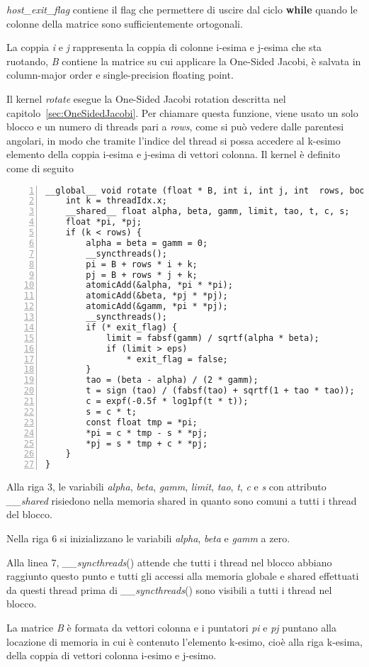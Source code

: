 \textit{host\_exit\_flag} contiene il flag che permettere di uscire dal ciclo \textbf{while} quando le colonne della matrice sono sufficientemente ortogonali.

La coppia \textit{i} e \textit{j} rappresenta la coppia di colonne i-esima e j-esima che sta ruotando, \textit{B} contiene la matrice su cui applicare la One-Sided Jacobi, è salvata in column-major order e single-precision floating point.

Il kernel \textit{rotate} esegue la One-Sided Jacobi rotation descritta nel capitolo~\ref{sec:OneSidedJacobi}. Per chiamare questa funzione, viene usato un solo blocco e un numero di threads pari a \textit{rows}, come si può vedere dalle parentesi angolari, in modo che tramite l'indice del thread si possa accedere al k-esimo elemento della coppia i-esima e j-esima di vettori colonna. Il kernel è definito come di seguito
\begin{lstlisting}[numbers=left]
__global__ void rotate (float * B, int i, int j, int  rows, bool * exit_flag){
	int k = threadIdx.x; 
	__shared__ float alpha, beta, gamm, limit, tao, t, c, s;
	float *pi, *pj;
	if (k < rows) {
		alpha = beta = gamm = 0;
		__syncthreads();
		pi = B + rows * i + k;
		pj = B + rows * j + k;
		atomicAdd(&alpha, *pi * *pi);
		atomicAdd(&beta, *pj * *pj);	
		atomicAdd(&gamm, *pi * *pj);
		__syncthreads();
		if (* exit_flag) {
			limit = fabsf(gamm) / sqrtf(alpha * beta);
			if (limit > eps) 
				* exit_flag = false;
		}
		tao = (beta - alpha) / (2 * gamm);
		t = sign (tao) / (fabsf(tao) + sqrtf(1 + tao * tao)); 
		c = expf(-0.5f * log1pf(t * t)); 
		s = c * t;
		const float tmp = *pi;
		*pi = c * tmp - s * *pj;
		*pj = s * tmp + c * *pj;
	}
}
\end{lstlisting}
Alla riga 3, le variabili \textit{alpha}, \textit{beta}, \textit{gamm}, \textit{limit}, \textit{tao}, \textit{t}, \textit{c} e \textit{s} con attributo \textit{\_\_shared} risiedono nella memoria shared in quanto sono comuni a tutti i thread del blocco.

Nella riga 6 si inizializzano le variabili \textit{alpha}, \textit{beta} e \textit{gamm} a zero. 

Alla linea 7, \textit{\_\_syncthreads}() attende che tutti i thread nel blocco abbiano raggiunto questo punto e tutti gli accessi alla memoria globale e shared effettuati da questi thread prima di \textit{\_\_syncthreads}() sono visibili a tutti i thread nel blocco.

La matrice \textit{B} è formata da vettori colonna e i puntatori \textit{pi} e \textit{pj} puntano alla locazione di memoria in cui è contenuto l'elemento k-esimo, cioè alla riga k-esima, della coppia di vettori colonna i-esimo e j-esimo. 


